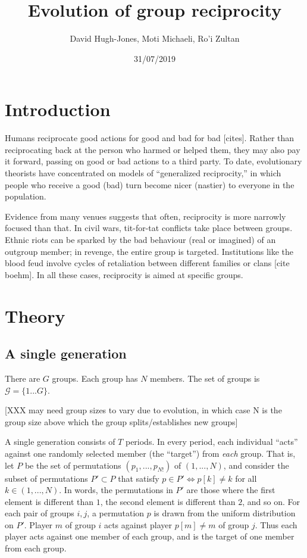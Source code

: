 \documentclass[
]{article}
\title{Evolution of group reciprocity}
\author{David Hugh-Jones, Moti Michaeli, Ro'i Zultan}
\date{31/07/2019}
\begin{document}
\maketitle

\hypertarget{introduction}{%
\section{Introduction}\label{introduction}}

Humans reciprocate good actions for good and bad for bad {[}cites{]}.
Rather than reciprocating back at the person who harmed or helped them,
they may also pay it forward, passing on good or bad actions to a third
party. To date, evolutionary theorists have concentrated on models of
``generalized reciprocity,'' in which people who receive a good (bad)
turn become nicer (nastier) to everyone in the population.

Evidence from many venues suggests that often, reciprocity is more
narrowly focused than that. In civil wars, tit-for-tat conflicts take
place between groups. Ethnic riots can be sparked by the bad behaviour
(real or imagined) of an outgroup member; in revenge, the entire group
is targeted. Institutions like the blood feud involve cycles of
retaliation between different families or clans {[}cite boehm{]}. In all
these cases, reciprocity is aimed at specific groups.

\hypertarget{theory}{%
\section{Theory}\label{theory}}

\hypertarget{a-single-generation}{%
\subsection{A single generation}\label{a-single-generation}}

There are \(G\) groups. Each group has \(N\) members. The set of groups
is \(\mathcal{G} = \{1 ... G\}\).

{[}XXX may need group sizes to vary due to evolution, in which case N is
the group size above which the group splits/establishes new groups{]}

A single generation consists of \(T\) periods. In every period, each
individual ``acts'' against one randomly selected member (the
``target'') from \emph{each} group. That is, let \(P\) be the set of
permutations \((p_1, ..., p_{N!})\) of \((1, ..., N)\),
and consider the subset of permutations $P'\subset P$ that satisfy
\(p \in P' \Longleftrightarrow p[k] \ne k\) for all \(k \in (1, ..., N)\). 
In words, the permutations in $P'$ are those where the first element is different than $1$, the second element is different than $2$, and so on.
For each pair of groups \(i, j\), a
permutation \(p\) is drawn from the uniform distribution on \(P'\).
Player \(m\) of group \(i\) acts against player \(p[m] \ne m\) of group \(j\).
Thus each player acts against one member of each group, and is the
target of one member from each group.
\end{document}
